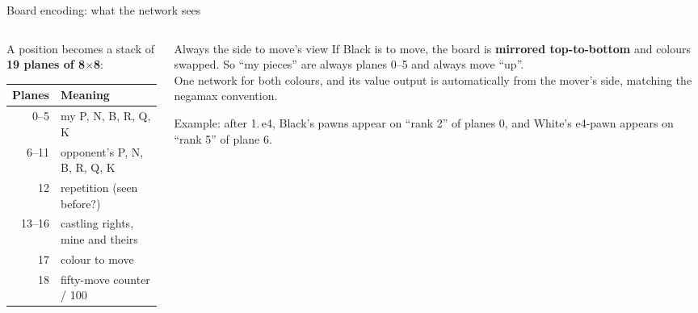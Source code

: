 \documentclass[aspectratio=169, 10pt]{beamer}
\begin{document}
\begin{frame}{Board encoding: what the network sees}
  \begin{columns}[T]
    \begin{column}{0.5\textwidth}
      A position becomes a stack of \textbf{19 planes of 8$\times$8}:
      \medskip

      \small
      \begin{tabular}{@{}rl@{}}
        \toprule
        Planes & Meaning \\
        \midrule
        0--5 & my P, N, B, R, Q, K \\
        6--11 & opponent's P, N, B, R, Q, K \\
        12 & repetition (seen before?) \\
        13--16 & castling rights, mine and theirs \\
        17 & colour to move \\
        18 & fifty-move counter / 100 \\
        \bottomrule
      \end{tabular}
    \end{column}
    \begin{column}{0.46\textwidth}
      \begin{block}{Always the side to move's view}
        \small
        If Black is to move, the board is \textbf{mirrored top-to-bottom} and colours swapped.
        So ``my pieces'' are always planes 0--5 and always move ``up''.\\[4pt]
        One network for both colours, and its value output is automatically from the mover's
        side, matching the negamax convention.
      \end{block}
      {\small Example: after 1.\,e4, Black's pawns appear on ``rank 2'' of planes 0, and
      White's e4-pawn appears on ``rank 5'' of plane 6.}
    \end{column}
  \end{columns}
\end{frame}
\end{document}
